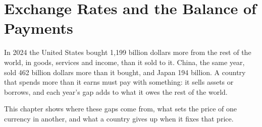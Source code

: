 \chapter{Exchange Rates and the Balance of Payments}\label{ch:g12:exchange-rates-and-balance-of-payments}

In 2024 the United States bought 1,199 billion dollars more from the rest of the world, in goods, services and income, than it sold to it. China, the same year, sold 462
billion dollars more than it bought, and Japan 194 billion. A country that spends more than it earns must pay with something: it sells assets or borrows, and each year's
gap adds to what it owes the rest of the world.

This chapter shows where these gaps come from, what sets the price of one currency in another, and what a country gives up when it fixes that price.

